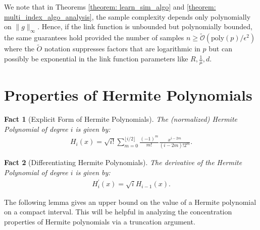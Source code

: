 \documentclass[final,12pt]{colt2018} %
\newtheorem{fact}{Fact}
\begin{document}
\begin{remark} We note that in Theorems \ref{theorem: learn_sim_algo} and \ref{theorem: multi_index_algo_analysis}, the sample complexity depends only polynomially on $\| g\|_\infty$. Hence, if the link function is unbounded but polynomially bounded, the same guarantees hold provided the number of samples $n \geq \tilde{\mathcal{O}}(\text{poly}(p)/\epsilon^2)$ where the $\tilde{O}$ notation suppresses factors that are logarithmic in $p$ but can possibly be exponential in the link function parameters like $R,\frac{1}{\mu},d$.
\end{remark}




\section{Properties of Hermite Polynomials}

\begin{fact}[Explicit Form of Hermite Polynomials] The (normalized) Hermite Polynomial of degree $i$ is given by:
\begin{align*}
    H_i(x) = \sqrt{i!} \sum_{m=0}^{\lfloor i/2\rfloor} \frac{(-1)^m}{m!}\frac{x^{i-2m}}{(i-2m)! 2^m}.
\end{align*}
\label{fact: hermite_explicit}
\end{fact}

\begin{fact}[Differentiating Hermite Polynomials] The derivative of the Hermite Polynomial of degree $i$ is given by:
\begin{align*}
    H_i^\prime(x) = \sqrt{i} H_{i-1}(x).
\end{align*}
\label{fact: hermite_diff}
\end{fact}

The following lemma gives an upper bound on the value of a Hermite polynomial on a compact interval. This will be helpful in analyzing the concentration properties of Hermite polynomials via a truncation argument. 
\end{document}
